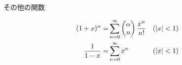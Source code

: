 \documentclass[12pt,b5paper]{ltjsarticle}
\begin{document}
\hrulefill
その他の関数
\hrulefill

\begin{align}
 (1+x)^{\alpha}
 =& \sum_{n=0}^{\infty}
 \begin{pmatrix}\alpha \\ n \end{pmatrix}
 \frac{
 x^{n}}{n!} & ( \lvert x \rvert < 1)\\
%
 \frac{1}{1-x}
 =& \sum_{n=0}^{\infty}
 x^n & ( \lvert x \rvert < 1)
%
\end{align}
\end{document}

